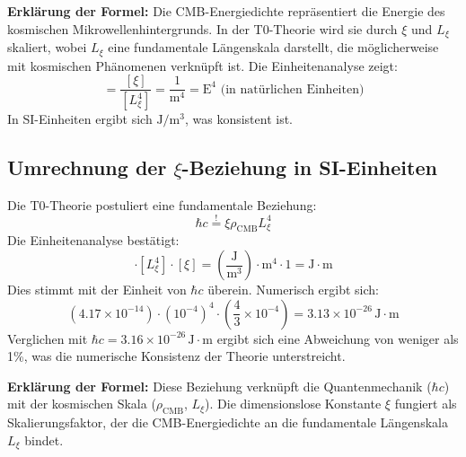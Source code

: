 \documentclass{article}
\begin{document}
	\textbf{Erklärung der Formel:} Die CMB-Energiedichte repräsentiert die Energie des kosmischen Mikrowellenhintergrunds. In der T0-Theorie wird sie durch $\xi$ und $L_\xi$ skaliert, wobei $L_\xi$ eine fundamentale Längenskala darstellt, die möglicherweise mit kosmischen Phänomenen verknüpft ist. Die Einheitenanalyse zeigt:
	\begin{equation}
		[\rho_{\text{CMB}}] = \frac{[\xi]}{[L_\xi^4]} = \frac{1}{\text{m}^4} = \text{E}^4 \text{ (in natürlichen Einheiten)}
	\end{equation}
	In SI-Einheiten ergibt sich $\text{J}/\text{m}^3$, was konsistent ist.
	
	\subsection{Umrechnung der $\xi$-Beziehung in SI-Einheiten}
	Die T0-Theorie postuliert eine fundamentale Beziehung:
	\begin{equation}
		\hbar c \stackrel{!}{=} \xi \rho_{\text{CMB}} L_\xi^4
	\end{equation}
	Die Einheitenanalyse bestätigt:
	\begin{equation}
		[\rho_{\text{CMB}}] \cdot [L_\xi^4] \cdot [\xi] = \left( \frac{\text{J}}{\text{m}^3} \right) \cdot \text{m}^4 \cdot 1 = \text{J} \cdot \text{m}
	\end{equation}
	Dies stimmt mit der Einheit von $\hbar c$ überein. Numerisch ergibt sich:
	\begin{equation}
		\left( 4.17 \times 10^{-14} \right) \cdot \left( 10^{-4} \right)^4 \cdot \left( \frac{4}{3} \times 10^{-4} \right) = 3.13 \times 10^{-26} \, \text{J} \cdot \text{m}
	\end{equation}
	Verglichen mit $\hbar c = 3.16 \times 10^{-26} \, \text{J} \cdot \text{m}$ ergibt sich eine Abweichung von weniger als 1\%, was die numerische Konsistenz der Theorie unterstreicht.
	
	\textbf{Erklärung der Formel:} Diese Beziehung verknüpft die Quantenmechanik ($\hbar c$) mit der kosmischen Skala ($\rho_{\text{CMB}}$, $L_\xi$). Die dimensionslose Konstante $\xi$ fungiert als Skalierungsfaktor, der die CMB-Energiedichte an die fundamentale Längenskala $L_\xi$ bindet.
	
\end{document}
